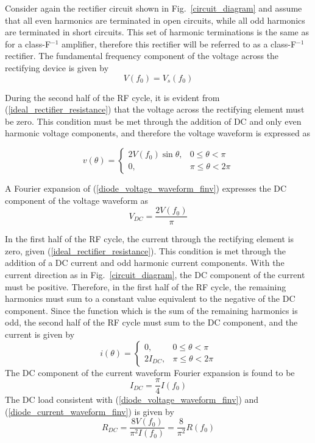 Consider again the rectifier circuit shown in Fig.~\ref{circuit_diagram} and assume that all even harmonics are terminated in open circuits, while all odd harmonics are terminated in short circuits. This set of harmonic terminations is the same as for a class-F$^{-1}$ amplifier, therefore this rectifier will be referred to as a class-F$^{-1}$ rectifier. The fundamental frequency component of the voltage across the rectifying device is given by
\begin{equation}\label{fundamental_diode_voltage}
    V(f_0) = V_s(f_0)
\end{equation}

During the second half of the RF cycle, it is evident from (\ref{ideal_rectifier_resistance}) that the voltage across the rectifying element must be zero.  This condition must be met through the addition of DC and only even harmonic voltage components, and therefore the voltage waveform is expressed as

\begin{equation}\label{diode_voltage_waveform_finv}
v(\theta) =
\begin{cases}
    2V(f_0)\sin\theta, & 0 \leq \theta < \pi\\
    0, & \pi \leq \theta < 2\pi
\end{cases}
\end{equation}


A Fourier expansion of (\ref{diode_voltage_waveform_finv}) expresses the DC component of the voltage waveform as
\begin{equation}\label{DC_diode_voltage}
    V_{DC} = \frac{2V(f_0)}{\pi}
\end{equation}

In the first half of the RF cycle, the current through the rectifying element is zero, given (\ref{ideal_rectifier_resistance}). This condition is met through the addition of a DC current and odd harmonic current components. With the current direction as in Fig.~\ref{circuit_diagram}, the DC component of the current must be positive.  Therefore, in the first half of the RF cycle, the remaining harmonics must sum to a constant value equivalent to the negative of the DC component.  Since the function which is the sum of the remaining harmonics is odd, the second half of the RF cycle must sum to the DC component, and the current is given by
\begin{equation}\label{diode_current_waveform_finv}
i(\theta) =
\begin{cases}
    0, & 0 \leq \theta < \pi\\
    2I_{DC}, & \pi \leq \theta < 2\pi
\end{cases}
\end{equation}
The DC component of the current waveform Fourier expansion is found to be
\begin{equation}\label{DC_diode_current}
    I_{DC} = \frac{\pi}{4}I(f_0)
\end{equation}
The DC load consistent with (\ref{diode_voltage_waveform_finv}) and (\ref{diode_current_waveform_finv}) is given by
\begin{equation}\label{DC_resistance}
    R_{DC} = \frac{8V(f_0)}{\pi^2I(f_0)} = \frac{8}{\pi^2}R(f_0)
\end{equation}

